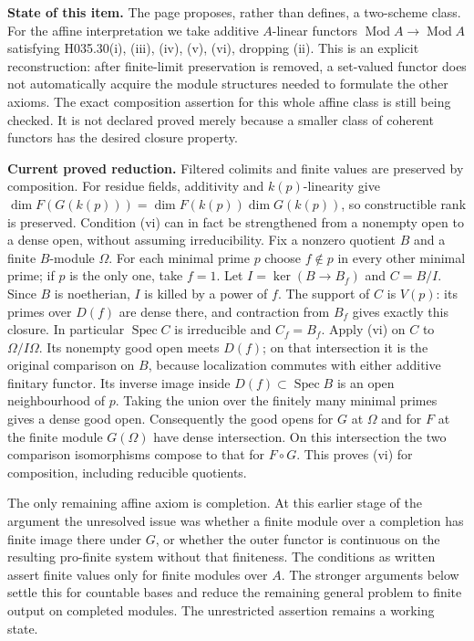 \textbf{State of this item.} The page proposes, rather than defines,
a two-scheme class. For the affine interpretation we take additive
$A$-linear functors $\operatorname{Mod}A\to\operatorname{Mod}A$
satisfying H035.30(i), (iii), (iv), (v), (vi), dropping (ii).
This is an explicit reconstruction: after finite-limit preservation
is removed, a set-valued functor does not automatically acquire the
module structures needed to formulate the other axioms. The exact
composition assertion for this whole affine class is still being
checked. It is not declared proved merely because a smaller class
of coherent functors has the desired closure property.

\textbf{Current proved reduction.} Filtered colimits and finite values
are preserved by composition. For residue fields, additivity and
$k(p)$-linearity give
$\dim F(G(k(p)))=\dim F(k(p))\dim G(k(p))$, so constructible rank
is preserved. Condition (vi) can in fact be strengthened from a
nonempty open to a dense open, without assuming irreducibility.
Fix a nonzero quotient $B$ and a finite $B$-module $\Omega$.
For each minimal prime $p$ choose $f\notin p$ in every other
minimal prime; if $p$ is the only one, take $f=1$.
Let $I=\ker(B\to B_f)$ and $C=B/I$. Since $B$ is noetherian,
$I$ is killed by a power of $f$. The support of $C$ is $V(p)$:
its primes over $D(f)$ are dense there, and contraction from
$B_f$ gives exactly this closure. In particular $\operatorname{Spec}C$
is irreducible and $C_f=B_f$. Apply (vi) on $C$ to
$\Omega/I\Omega$. Its nonempty good open meets $D(f)$;
on that intersection it is the original comparison on $B$,
because localization commutes with either additive finitary functor.
Its inverse image inside $D(f)\subset\operatorname{Spec}B$
is an open neighbourhood of $p$. Taking the union over the finitely
many minimal primes gives a dense good open. Consequently the good
opens for $G$ at $\Omega$ and for $F$ at the finite module
$G(\Omega)$ have dense intersection. On this intersection the two
comparison isomorphisms compose to that for $F\circ G$.
This proves (vi) for composition, including reducible quotients.

The only remaining affine axiom is completion. At this earlier stage of the
argument the unresolved issue was
whether a finite module over a completion has finite image there
under $G$, or whether the outer functor is continuous on the
resulting pro-finite system without that finiteness. The conditions
as written assert finite values only for finite modules over $A$.
The stronger arguments below settle this for countable bases and reduce
the remaining general problem to finite output on completed modules.
The unrestricted assertion remains a working state.

